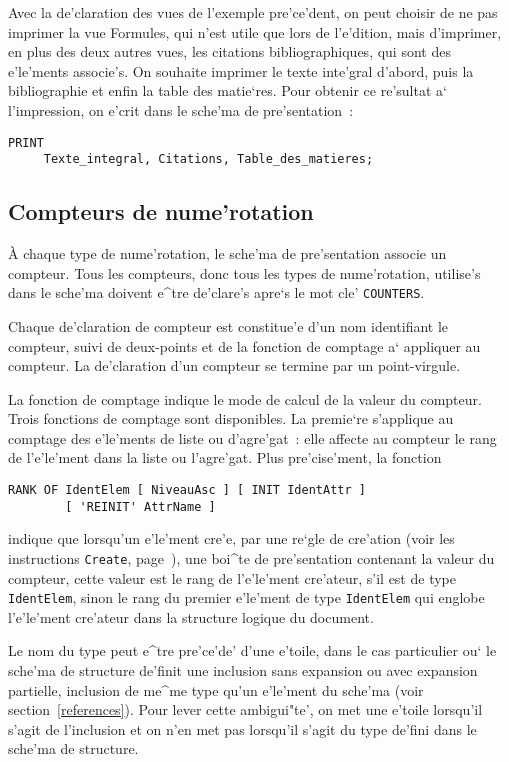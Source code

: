 {\begin{example}
Avec la de'claration des vues de l'exemple pre'ce'dent, on peut choisir de
ne pas imprimer la vue Formules, qui n'est utile que lors de l'e'dition,
mais d'imprimer, en plus des deux autres vues, les citations bibliographiques,
qui sont des e'le'ments associe's. On souhaite imprimer le texte inte'gral
d'abord, puis la bibliographie et enfin la table des matie`res. Pour obtenir
ce re'sultat a` l'impression, on e'crit dans le sche'ma de pre'sentation~:

\begin{verbatim}
PRINT
     Texte_integral, Citations, Table_des_matieres;
\end{verbatim}
\end{example}

\subsection{Compteurs de nume'rotation}

\`{A} chaque type de nume'rotation, le sche'ma de pre'sentation associe un
compteur. Tous les compteurs, donc tous les types de nume'rotation, utilise's
dans le sche'ma doivent e^tre de'clare's apre`s le mot cle' {\tt COUNTERS}.

Chaque de'claration de compteur est constitue'e d'un nom identifiant le
compteur, suivi de deux-points et de la fonction de comptage
a` appliquer au compteur. La de'claration d'un compteur se termine par un
point-virgule.

La fonction de comptage indique le mode de calcul de la valeur du compteur.
Trois fonctions de comptage sont disponibles. La premie`re s'applique au
comptage des e'le'ments de liste ou d'agre'gat~: elle affecte au compteur
le rang de l'e'le'ment dans la liste ou l'agre'gat. Plus pre'cise'ment,
la fonction
\begin{verbatim}
RANK OF IdentElem [ NiveauAsc ] [ INIT IdentAttr ]
        [ 'REINIT' AttrName ]
\end{verbatim}
indique que lorsqu'un e'le'ment cre'e, par une re`gle de cre'ation (voir
les instructions {\tt Create}, page~\pageref{creation}), une boi^te de
pre'sentation contenant la valeur du compteur, cette valeur est le rang de
l'e'le'ment cre'ateur, s'il est de type {\tt IdentElem}, sinon le rang du
premier e'le'ment de type {\tt IdentElem} qui englobe l'e'le'ment cre'ateur
dans la structure logique du document.

Le nom du type peut e^tre pre'ce'de' d'une e'toile, dans le cas particulier
ou` le sche'ma de structure de'finit une inclusion sans expansion ou avec
expansion partielle, inclusion de me^me
type qu'un e'le'ment du sche'ma (voir section~\ref{references}).
Pour lever cette ambigui"te', on met une e'toile lorsqu'il s'agit de
l'inclusion et on n'en met pas lorsqu'il s'agit du type de'fini dans le
sche'ma de structure.

}
